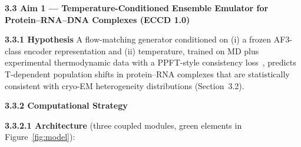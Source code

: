 \documentclass[11pt]{article}
\begin{document}
\textbf{3.3 Aim 1 --- Temperature-Conditioned Ensemble Emulator for Protein--RNA--DNA Complexes (ECCD 1.0)}

\textbf{3.3.1 Hypothesis} A flow-matching generator conditioned on (i) a frozen AF3-class encoder representation and (ii) temperature, trained on MD plus experimental thermodynamic data with a PPFT-style consistency loss~\cite{lewis_Scalable_2025}, predicts T-dependent population shifts in protein--RNA complexes that are statistically consistent with cryo-EM heterogeneity distributions (Section~3.2).

\textbf{3.3.2 Computational Strategy}


\textbf{3.3.2.1 Architecture} (three coupled modules, green elements in Figure~\ref{fig:model}):
\end{document}
